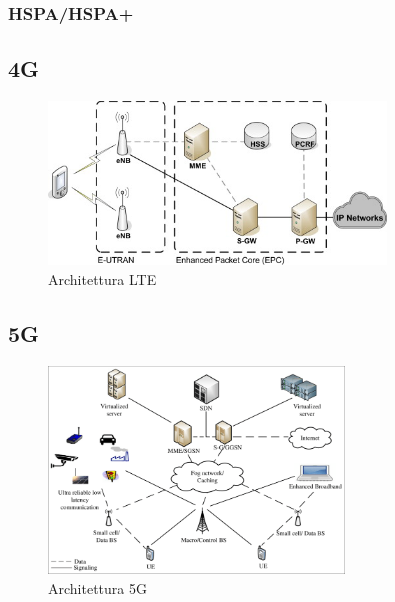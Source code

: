 \subsubsection{HSPA/HSPA+}


\subsection{4G}
\begin{figure}[ht]
    \centering
    \includegraphics[width=0.8\textwidth]{images/4g-lte.jpg}
    \caption{Architettura LTE}
\end{figure}

\subsection{5G}
\begin{figure}[ht]
    \centering
    \includegraphics[width=0.7\textwidth]{images/5g.png}
    \caption{Architettura 5G}
\end{figure}